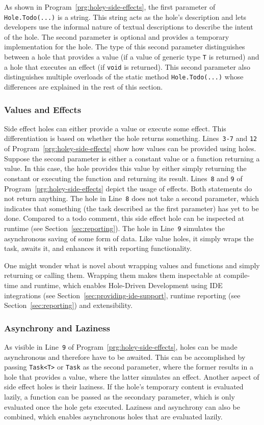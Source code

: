 As shown in Program~\ref{prg:holey-side-effects}, the first parameter of \verb|Hole.Todo(...)| is a string.
This string acts as the hole's description and lets developers use the informal nature of textual descriptions to describe the intent of the hole.
The second parameter is optional and provides a temporary implementation for the hole.
The type of this second parameter distinguishes between a hole that provides a value (if a value of generic type \verb|T| is returned) and a hole that executes an effect (if \verb|void| is returned).
This second parameter also distinguishes multiple overloads of the static method \verb|Hole.Todo(...)| whose differences are explained in the rest of this section.

\subsubsection{Values and Effects}
Side effect holes can either provide a value or execute some effect.
This differentiation is based on whether the hole returns something.
Lines~\verb|3-7| and \verb|12| of Program~\ref{prg:holey-side-effects} show how values can be provided using holes.
Suppose the second parameter is either a constant value or a function returning a value.
In this case, the hole provides this value by either simply returning the constant or executing the function and returning its result.
Lines~\verb|8| and \verb|9| of Program~\ref{prg:holey-side-effects} depict the usage of effects.
Both statements do not return anything.
The hole in Line~\verb|8| does not take a second parameter, which indicates that something (the task described as the first parameter) has yet to be done.
Compared to a todo comment, this side effect hole can be inspected at runtime (see Section~\ref{sec:reporting}).
The hole in Line~\verb|9| simulates the asynchronous saving of some form of data.
Like value holes, it simply wraps the task, awaits it, and enhances it with reporting functionality.

One might wonder what is novel about wrapping values and functions and simply returning or calling them.
Wrapping them makes them inspectable at compile-time and runtime, which enables Hole-Driven Development using IDE integrations (see Section~\ref{sec:providing-ide-support}, runtime reporting (see Section~\ref{sec:reporting}) and extensibility.

\subsubsection{Asynchrony and Laziness}
As visible in Line~\verb|9| of Program~\ref{prg:holey-side-effects}, holes can be made asynchronous and therefore have to be awaited.
This can be accomplished by passing \verb|Task<T>| or \verb|Task| as the second parameter, where the former results in a hole that provides a value, where the latter simulates an effect.
Another aspect of side effect holes is their laziness.
If the hole's temporary content is evaluated lazily, a function can be passed as the secondary parameter, which is only evaluated once the hole gets executed.
Laziness and asynchrony can also be combined, which enables asynchronous holes that are evaluated lazily.

